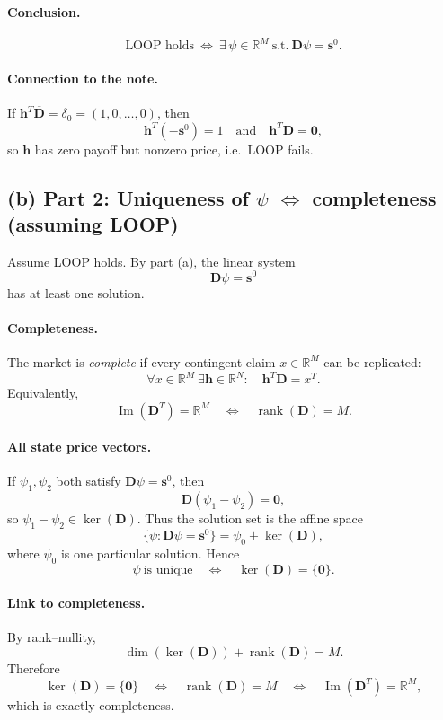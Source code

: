\documentclass{article}
\begin{document}
\paragraph{Conclusion.}
\[
\boxed{\text{LOOP holds}\ \iff\ \exists\,\psi\in\mathbb{R}^M\ \text{s.t.}\ \mathbf{D}\psi=\mathbf{s}^0.}
\]

\paragraph{Connection to the note.}
If $\mathbf{h}^T\overline{\mathbf{D}}=\delta_0=(1,0,\dots,0)$, then
\[
\mathbf{h}^T(-\mathbf{s}^0)=1
\quad\text{and}\quad
\mathbf{h}^T\mathbf{D}=\mathbf{0},
\]
so $\mathbf{h}$ has zero payoff but nonzero price, i.e.\ LOOP fails.

\bigskip

\subsection*{(b) Part 2: Uniqueness of $\psi$ $\Leftrightarrow$ completeness (assuming LOOP)}

Assume LOOP holds. By part (a), the linear system
\[
\mathbf{D}\psi=\mathbf{s}^0
\]
has at least one solution.

\paragraph{Completeness.}
The market is \emph{complete} if every contingent claim $x\in\mathbb{R}^M$ can be replicated:
\[
\forall x\in\mathbb{R}^M\ \exists \mathbf{h}\in\mathbb{R}^N:\quad \mathbf{h}^T\mathbf{D}=x^T.
\]
Equivalently,
\[
\operatorname{Im}(\mathbf{D}^T)=\mathbb{R}^M
\quad\iff\quad
\operatorname{rank}(\mathbf{D})=M.
\]

\paragraph{All state price vectors.}
If $\psi_1,\psi_2$ both satisfy $\mathbf{D}\psi=\mathbf{s}^0$, then
\[
\mathbf{D}(\psi_1-\psi_2)=\mathbf{0},
\]
so $\psi_1-\psi_2\in\ker(\mathbf{D})$. Thus the solution set is the affine space
\[
\{\psi:\mathbf{D}\psi=\mathbf{s}^0\}=\psi_0+\ker(\mathbf{D}),
\]
where $\psi_0$ is one particular solution. Hence
\[
\psi\ \text{is unique}\quad\iff\quad \ker(\mathbf{D})=\{\mathbf{0}\}.
\]

\paragraph{Link to completeness.}
By rank--nullity,
\[
\dim(\ker(\mathbf{D}))+\operatorname{rank}(\mathbf{D})=M.
\]
Therefore
\[
\ker(\mathbf{D})=\{\mathbf{0}\}
\quad\iff\quad
\operatorname{rank}(\mathbf{D})=M
\quad\iff\quad
\operatorname{Im}(\mathbf{D}^T)=\mathbb{R}^M,
\]
which is exactly completeness.
\end{document}
